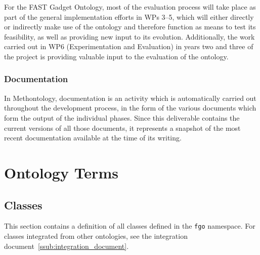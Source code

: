 \documentclass[twoside]{fast_latex}
\begin{document}
For the FAST Gadget Ontology, most of the evaluation process will take place as part of the general implementation efforts in WPs 3--5, which will either directly or indirectly make use of the ontology and therefore function as means to test its feasibility, as well as providing new input to its evolution. Additionally, the work carried out in WP6 (Experimentation and Evaluation) in years two and three of the project is providing valuable input to the evaluation of the ontology.

\subsubsection{Documentation} %
\label{ssub:documentation}

In Methontology, documentation is an activity which is automatically carried out throughout the development process, in the form of the various documents which form the output of the individual phases. Since this deliverable contains the current versions of all those documents, it represents a snapshot of the most recent documentation available at the time of its writing.



% 


\clearpage
{}
\section{Ontology Terms}
\label{sec:ontology_terms}
\subsection{Classes} %
\label{sub:classes}

This section contains a definition of all classes defined in the \texttt{fgo} namespace. For classes integrated from other ontologies, see the integration document~\ref{ssub:integration_document}.
\end{document}
